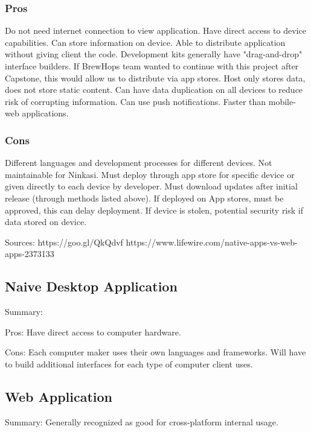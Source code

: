 \documentclass[draftclsnofoot,onecolumn,letterpaper,10pt,compsoc]{IEEEtran}
\begin{document}
        \subsubsection{Pros}
            Do not need internet connection to view application.
            Have direct access to device capabilities.
            Can store information on device.
            Able to distribute application without giving client the code.
            Development kits generally have "drag-and-drop" interface builders.
            If BrewHops team wanted to continue with this project after Capstone, this would allow us to distribute via app stores.
            Host only stores data, does not store static content.
            Can have data duplication on all devices to reduce risk of corrupting information.
            Can use push notifications.
            Faster than mobile-web applications.

        \subsubsection{Cons}
            Different languages and development processes for different devices.
            Not maintainable for Ninkasi.
            Must deploy through app store for specific device or given directly to each device by developer.
            Must download updates after initial release (through methods listed above).
            If deployed on App stores, must be approved, this can delay deployment.
            If device is stolen, potential security risk if data stored on device.

        Sources:
        https://goo.gl/QkQdvf
        https://www.lifewire.com/native-apps-vs-web-apps-2373133
    
    
	\subsection{Naive Desktop Application}
    Summary:
    
    Pros:
        Have direct access to computer hardware.
    
    Cons:
        Each computer maker uses their own languages and frameworks.
        Will have to build additional interfaces for each type of computer          client uses.
    
    
	\subsection{Web Application}
    Summary:
        Generally recognized as good for cross-platform internal usage.
    
\end{document}
